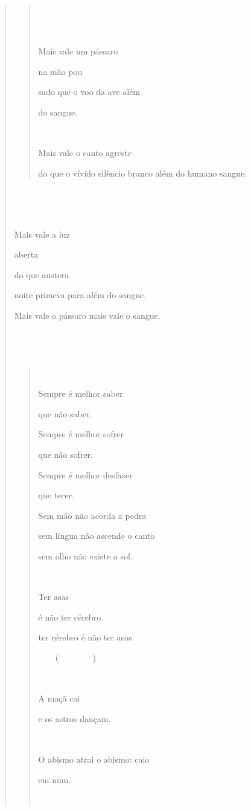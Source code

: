\begin{verse}
\begin{quote}




Mais vale um pássaro

na mão pou

sado que o voo da ave além

do sangue.



Mais vale o canto agreste

do que o vívido silêncio branco além do humano sangue.
\end{quote}





Mais vale a luz

aberta

do que austera

noite primeva para além do sangue.

Mais vale o pássaro mais vale o sangue.

\subsection{}\label{section-10}

\begin{quote}


Sempre é melhor saber

que não saber.

Sempre é melhor sofrer

que não sofrer.

Sempre é melhor desfazer

que tecer.

Sem mão não acorda a pedra

sem língua não ascende o canto

sem olho não existe o sol.



Ter asas

é não ter cérebro.

ter cérebro é não ter asas.

 (  )



A maçã cai

e os astros dançam.



O abismo atrai o abismo: caio

em mim.




\end{quote}
\end{verse}
